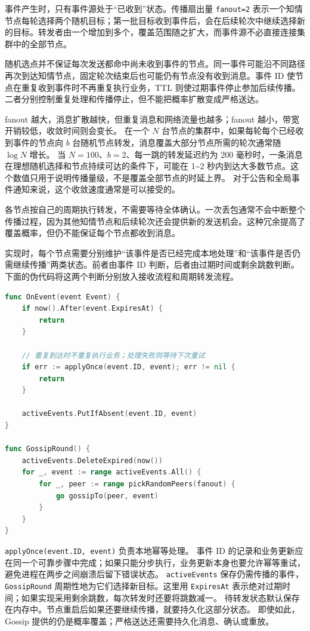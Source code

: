 事件产生时，只有事件源处于“已收到”状态。传播扇出量 \texttt{fanout=2} 表示一个知情节点每轮选择两个随机目标；第一批目标收到事件后，会在后续轮次中继续选择新的目标。转发者由一个增加到多个，覆盖范围随之扩大，而事件源不必直接连接集群中的全部节点。

随机选点并不保证每次发送都命中尚未收到事件的节点。同一事件可能沿不同路径再次到达知情节点，固定轮次结束后也可能仍有节点没有收到消息。事件 ID 使节点在重复收到事件时不再重复执行业务，TTL 则使过期事件停止参加后续传播。二者分别控制重复处理和传播停止，但不能把概率扩散变成严格送达。

fanout 越大，消息扩散越快，但重复消息和网络流量也越多；fanout 越小，带宽开销较低，收敛时间则会变长。
在一个 $N$ 台节点的集群中，如果每轮每个已经收到事件的节点向 $b$ 台随机节点转发，消息覆盖大部分节点所需的轮次通常随 $\log N$ 增长。
当 $N = 100$、$b = 2$、每一跳的转发延迟约为 200 毫秒时，一条消息在理想随机选择和节点持续可达的条件下，可能在 1\textasciitilde2 秒内到达大多数节点。这个数值只用于说明传播量级，不是覆盖全部节点的时延上界。
对于公告和全局事件通知来说，这个收敛速度通常是可以接受的。

各节点按自己的周期执行转发，不需要等待全体确认。一次丢包通常不会中断整个传播过程，因为其他知情节点和后续轮次还会提供新的发送机会。这种冗余提高了覆盖概率，但仍不能保证每个节点都收到消息。

实现时，每个节点需要分别维护“该事件是否已经完成本地处理”和“该事件是否仍需继续传播”两类状态。前者由事件 ID 判断，后者由过期时间或剩余跳数判断。下面的伪代码将这两个判断分别放入接收流程和周期转发流程。

\begin{tcolorbox}[title=Gossip 的转发判断]
\begin{lstlisting}[style=codeblock, language=go]
func OnEvent(event Event) {
    if now().After(event.ExpiresAt) {
        return
    }

    // 重复到达时不重复执行业务；处理失败则等待下次重试
    if err := applyOnce(event.ID, event); err != nil {
        return
    }

    activeEvents.PutIfAbsent(event.ID, event)
}

func GossipRound() {
    activeEvents.DeleteExpired(now())
    for _, event := range activeEvents.All() {
        for _, peer := range pickRandomPeers(fanout) {
            go gossipTo(peer, event)
        }
    }
}
\end{lstlisting}
\end{tcolorbox}

\texttt{applyOnce(event.ID, event)} 负责本地幂等处理。
事件 ID 的记录和业务更新应在同一个可靠步骤中完成；如果只能分步执行，业务更新本身也要允许幂等重试，避免进程在两步之间崩溃后留下错误状态。
\texttt{activeEvents} 保存仍需传播的事件，\texttt{GossipRound} 周期性地为它们选择新目标。这里用 \texttt{ExpiresAt} 表示绝对过期时间；如果实现采用剩余跳数，每次转发时还要将跳数减一。
待转发状态默认保存在内存中。节点重启后如果还要继续传播，就要持久化这部分状态。
即使如此，Gossip 提供的仍是概率覆盖；严格送达还需要持久化消息、确认或重放。

